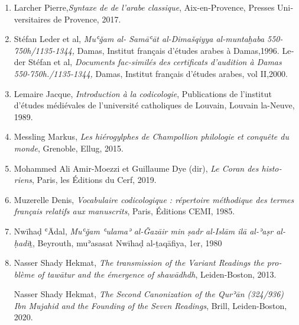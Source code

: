 \documentclass[a4paper,12pt]{report}
\begin{document}
\begin{french}
\begin{enumerate} [III]
\begin{enumerate}
\item Larcher Pierre,\textit{Syntaxe de de l'arabe classique}, Aix-en-Provence, Presses Universitaires de Provence, 2017.


\item Stéfan Leder et al, \textit{Muʿǧam al- Samāʿāt al-Dimašqiyya  al-muntaḫaba 550-750h/1135-1344,} Damas, Institut français d’études arabes à Damas,1996.
\textemdash\textemdash  Leder Stéfan et al, \textit{Documents fac-similés des certificats d’audition à Damas 550-750h./1135-1344,} Damas, Institut français d’études arabes,  vol II,2000.

  
\item Lemaire Jacque, \textit{Introduction à la codicologie}, Publications de l’institut d’études médiévales de l’université catholiques de Louvain, Louvain la-Neuve, 1989.

     \item Messling Markus, \textit{Les hiérogylphes de Champollion philologie et conquête du monde}, Grenoble, Ellug, 2015.
       

    
\item Mohammed Ali Amir-Moezzi et Guillaume Dye (dir), \textit{Le Coran des historiens}, Paris, les Éditions du Cerf, 2019.

\item 	Muzerelle Denis, \textit{Vocabulaire codicologique : répertoire méthodique des termes français relatifs aux manuscrits}, Paris, Éditions CEMI, 1985.  



\item Nwīhaḍ ʿĀdal, \textit {Muʿǧam ʿulamaʾ al-Ǧazāir min ṣadr al-Islām ilā al-ʾaṣr al-ḥadī}ṯ, Beyrouth,  muʾasasat Nwīhaḍ al-ṯaqāfiya, 1er, 1980











   \item  Nasser Shady Hekmat, \textit{The transmission of the Variant Readings the problème of tawātur and the émergence of shawādhdh}, Leiden-Boston, 2013.

\textemdash \textemdash 	 Nasser Shady Hekmat, \textit{The Second Canonization
of the Qurʾān (324/936) Ibn Mujahid and the Founding of the Seven Readings}, Brill, Leiden-Boston, 2020.

	
 


\end{enumerate}
\end{enumerate}
\end{french}
\end{document}
